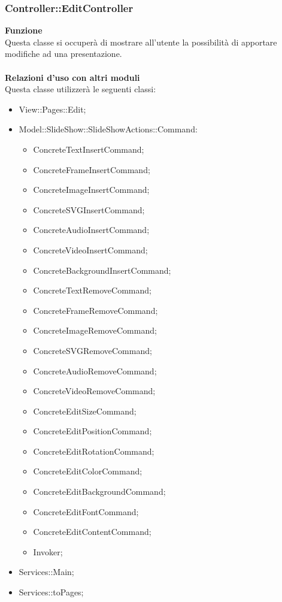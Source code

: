 {\subsubsection{Controller::EditController}{
	\textbf{Funzione}\\
	\indent Questa classe si occuperà di mostrare all'utente la possibilità di apportare modifiche ad una presentazione.\\\\
	\textbf{Relazioni d'uso con altri moduli}\\
	\indent Questa classe utilizzerà le seguenti classi:
	\begin{itemize}
		\item View::Pages::Edit;
		\item Model::SlideShow::SlideShowActions::Command:
		\begin{itemize}
			\item ConcreteTextInsertCommand;
			\item ConcreteFrameInsertCommand;
			\item ConcreteImageInsertCommand;
			\item ConcreteSVGInsertCommand;
			\item ConcreteAudioInsertCommand;
			\item ConcreteVideoInsertCommand;
			\item ConcreteBackgroundInsertCommand;
			\item ConcreteTextRemoveCommand;
			\item ConcreteFrameRemoveCommand;
			\item ConcreteImageRemoveCommand;
			\item ConcreteSVGRemoveCommand;
			\item ConcreteAudioRemoveCommand;
			\item ConcreteVideoRemoveCommand;
			\item ConcreteEditSizeCommand;
			\item ConcreteEditPositionCommand;
			\item ConcreteEditRotationCommand;
			\item ConcreteEditColorCommand;
			\item ConcreteEditBackgroundCommand;
			\item ConcreteEditFontCommand;
			\item ConcreteEditContentCommand;
			\item Invoker;
		\end{itemize}
		\item Services::Main;
		\item Services::toPages;

\end{itemize}}}
